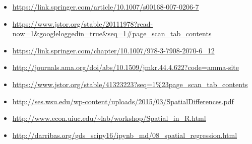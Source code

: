 \documentclass[11pt]{article}
\begin{document}
\begin{itemize}
\item \url{https://link.springer.com/article/10.1007/s00168-007-0206-7}
\item \url{https://www.jstor.org/stable/20111978?read-now=1\&googleloggedin=true\&seq=1\#page\_scan\_tab\_contents}
\item \url{https://link.springer.com/chapter/10.1007/978-3-7908-2070-6\_12}
\item \url{http://journals.ama.org/doi/abs/10.1509/jmkr.44.4.622?code=amma-site}
\item \url{https://www.jstor.org/stable/41323223?seq=1\%23page\_scan\_tab\_contents}
\item \url{http://ses.wsu.edu/wp-content/uploads/2015/03/SpatialDifferences.pdf}
\item \url{http://www.econ.uiuc.edu/\~lab/workshop/Spatial\_in\_R.html}
\item \url{http://darribas.org/gds\_scipy16/ipynb\_md/08\_spatial\_regression.html}
\end{itemize}
\end{document}
